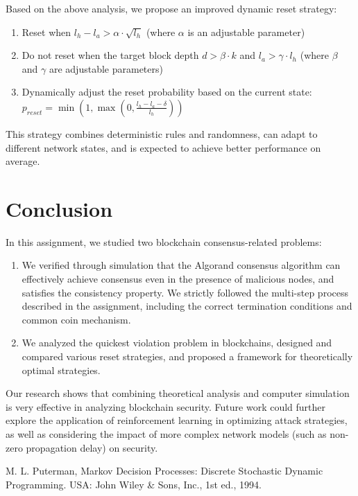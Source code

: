 \documentclass[12pt,a4paper]{article}
\begin{document}
Based on the above analysis, we propose an improved dynamic reset strategy:

\begin{enumerate}
    \item Reset when $l_h - l_a > \alpha \cdot \sqrt{l_h}$ (where $\alpha$ is an adjustable parameter)
    \item Do not reset when the target block depth $d > \beta \cdot k$ and $l_a > \gamma \cdot l_h$ (where $\beta$ and $\gamma$ are adjustable parameters)
    \item Dynamically adjust the reset probability based on the current state: $p_{reset} = \min(1, \max(0, \frac{l_h - l_a - \delta}{l_h}))$
\end{enumerate}

This strategy combines deterministic rules and randomness, can adapt to different network states, and is expected to achieve better performance on average.

\section{Conclusion}

In this assignment, we studied two blockchain consensus-related problems:

\begin{enumerate}
    \item We verified through simulation that the Algorand consensus algorithm can effectively achieve consensus even in the presence of malicious nodes, and satisfies the consistency property. We strictly followed the multi-step process described in the assignment, including the correct termination conditions and common coin mechanism.
    \item We analyzed the quickest violation problem in blockchains, designed and compared various reset strategies, and proposed a framework for theoretically optimal strategies.
\end{enumerate}

Our research shows that combining theoretical analysis and computer simulation is very effective in analyzing blockchain security. Future work could further explore the application of reinforcement learning in optimizing attack strategies, as well as considering the impact of more complex network models (such as non-zero propagation delay) on security.

\begin{thebibliography}{9}
M. L. Puterman, Markov Decision Processes: Discrete Stochastic Dynamic Programming. USA: John Wiley \& Sons, Inc., 1st ed., 1994.
\end{thebibliography}
\end{document}
